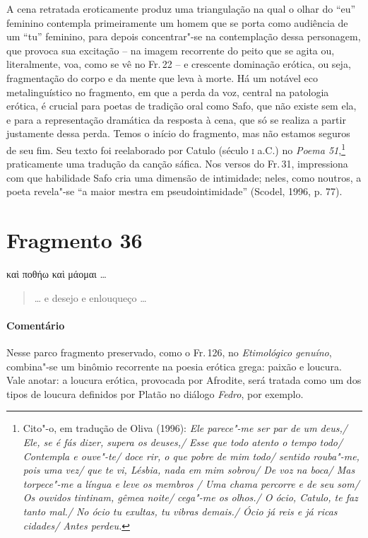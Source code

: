 {A cena retratada eroticamente produz uma triangulação na qual o olhar do “eu”
feminino contempla primeiramente um homem que se porta como audiência de um
“tu” feminino, para depois concentrar"-se na contemplação dessa
personagem, que provoca sua excitação -- na imagem recorrente do peito que se agita ou,
literalmente, voa, como se vê no Fr.\,22 -- e crescente dominação erótica, ou
seja, fragmentação do corpo e da mente que leva à morte. Há um notável eco
metalinguístico no fragmento, em que a perda da voz, central na patologia
erótica, é crucial para poetas de tradição oral como Safo, que não existe sem
ela, e para a representação dramática da resposta à cena, que só se realiza a
partir justamente dessa perda. Temos o início do fragmento, mas não estamos
seguros de seu fim. Seu texto foi reelaborado por Catulo (século \textsc{i}
a.C.) no \textit{Poema 51},\footnote{ Cito"-o, em tradução de Oliva (1996):
\textit{Ele parece"-me ser par de um deus,/ Ele, se é fás dizer, supera os
deuses,/ Esse que todo atento o tempo todo/ Contempla e ouve"-te/ doce rir, o
que pobre de mim todo/ sentido rouba"-me, pois uma vez/ que te vi, Lésbia,
nada em mim sobrou/ De voz na boca/ Mas torpece"-me a língua e leve os membros
/ Uma chama percorre e de seu som/ Os ouvidos tintinam, gêmea noite/ cega"-me
os olhos./ O ócio, Catulo, te faz tanto mal./ No ócio tu exultas, tu vibras
demais./ Ócio já reis e já ricas cidades/ Antes perdeu.}} praticamente uma
tradução da canção sáfica.
Nos versos do Fr.\,31, impressiona com que habilidade Safo cria uma dimensão de intimidade; neles, como noutros, a poeta revela"-se “a maior mestra em pseudointimidade” (Scodel, 1996, p. 77).}



\pagebreak
\section{Fragmento 36}

\begin{gkverse}
καὶ ποθήω καὶ μάομαι \ldots{}
\end{gkverse}

\begin{verse}
\ldots{} e desejo e enlouqueço \ldots{}
\end{verse}

{\paragraph{Comentário} Nesse parco fragmento preservado, como o Fr.\,126, no \textit{Etimológico genuíno}, combina"-se um binômio recorrente na poesia erótica grega:
paixão e loucura. Vale anotar: a loucura erótica, provocada por Afrodite, será
tratada como um dos tipos de loucura definidos por Platão
no diálogo \textit{Fedro}, por exemplo.}


